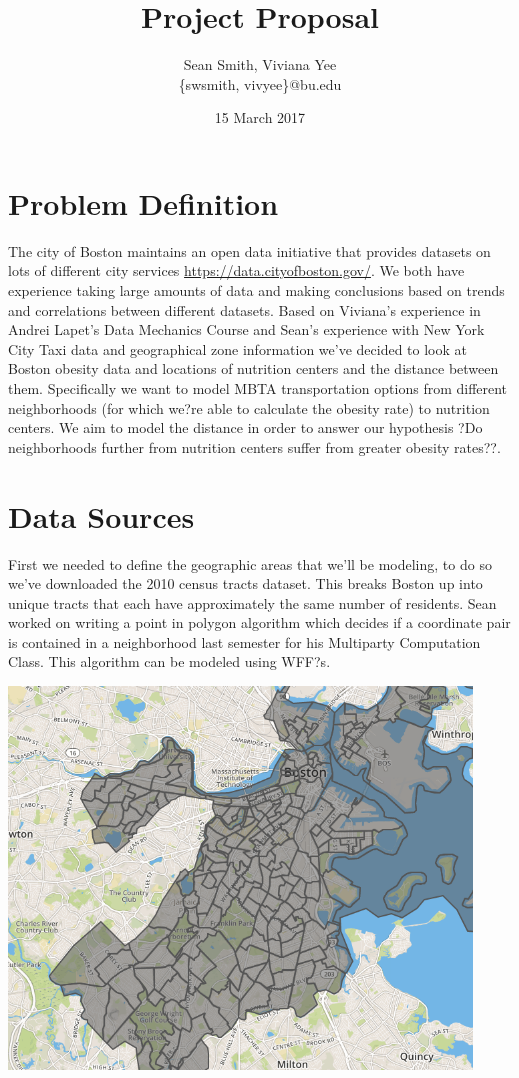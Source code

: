 \documentclass[12pt]{article}
\title{Project Proposal}
\author{Sean Smith, Viviana Yee \\ \{swsmith, vivyee\}@bu.edu}
\date{15 March 2017}
\begin{document}
\maketitle


\section{Problem Definition}
	The city of Boston maintains an open data initiative that provides datasets on lots of different city services \url{https://data.cityofboston.gov/}. We both have experience taking large amounts of data and making conclusions based on trends and correlations between different datasets. Based on Viviana's experience in Andrei Lapet's Data Mechanics Course and Sean's experience with New York City Taxi data and geographical zone information we've decided to look at Boston obesity data and locations of nutrition centers and the distance between them. Specifically we want to model MBTA transportation options from different neighborhoods (for which we?re able to calculate the obesity rate) to nutrition centers. We aim to model the distance in order to answer our hypothesis ?Do neighborhoods further from nutrition centers suffer from greater obesity rates??. 
 
 \section{Data Sources}
	First we needed to define the geographic areas that we'll be modeling, to do so we've downloaded the 2010 census tracts dataset. This breaks Boston up into unique tracts that each have approximately the same number of residents. Sean worked on writing a point in polygon algorithm which decides if a coordinate pair is contained in a neighborhood last semester for his Multiparty Computation Class. This algorithm can be modeled using WFF?s.

\includegraphics[height=4in]{boston_neighborhoods.png}
\end{document}
